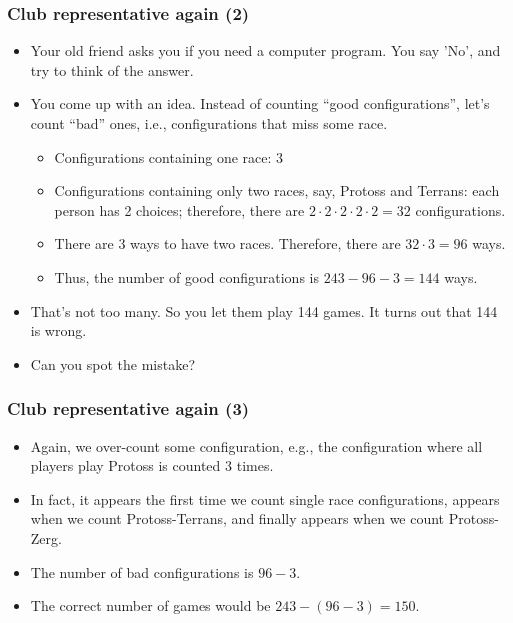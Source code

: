 \begin{frame}\frametitle{Club representative again (2)}
  \begin{itemize}
  \item Your old friend asks you if you need a computer program.  You
    say 'No', and try to think of the answer.
    \pause
  \item You come up with an idea.  Instead of counting ``good
    configurations'', let's count ``bad'' ones, i.e., configurations
    that miss some race.
    \pause
    \begin{itemize}
    \item Configurations containing one race: $3$
      \pause
    \item Configurations containing only two races, say, Protoss and
      Terrans: each person has 2 choices; therefore, there are $2\cdot
      2\cdot 2\cdot 2\cdot 2 = 32$ configurations.
      \pause
    \item There are 3 ways to have two races.  Therefore, there are
      $32\cdot 3 = 96$ ways.
      \pause
    \item Thus, the number of good configurations is $243 - 96 - 3 =
      144$ ways.
    \end{itemize}
    \pause
  \item That's not too many.  So you let them play 144 games.  \pause
    It turns out that 144 is wrong.
  \item Can you spot the mistake?
  \end{itemize}
\end{frame}

\begin{frame}\frametitle{Club representative again (3)}
  \begin{itemize}
  \item Again, we over-count some configuration,  \pause e.g., the
    configuration where all players play Protoss is counted 3 times.
    \pause
  \item In fact, it appears the first time we count single race
    configurations, appears when we count Protoss-Terrans, and finally
    appears when we count Protoss-Zerg.
    \pause
  \item The number of bad configurations is $96 - 3$. \pause
  \item The correct number of games would be $243 - (96 - 3) = 150$.
  \end{itemize}
\end{frame}

